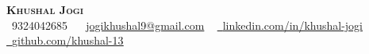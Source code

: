 \begin{center}
    {\Huge \scshape \textbf{Khushal Jogi}}  \\ \vspace{3pt}
    \small \raisebox{-0.1\height}\faPhone\ 9324042685 ~ \raisebox{-0.2\height}\faEnvelope\  \underline{jogikhushal9@gmail.com} ~ 
    \href{https://www.linkedin.com/in/khushal-jogi/}{\raisebox{-0.2\height}\faLinkedin\ \underline{linkedin.com/in/khushal-jogi}}  ~
    \href{https://github.com/khushal-13}{\raisebox{-0.2\height}\faGithub\ \underline{github.com/khushal-13}}
    
    \vspace{1pt}
\end{center}
